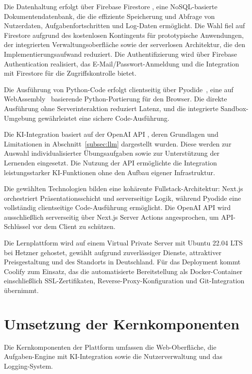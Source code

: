 Die Datenhaltung erfolgt über Firebase Firestore \cite{firebase}, eine NoSQL-basierte Dokumentendatenbank, die die effiziente Speicherung und Abfrage von Nutzerdaten, Aufgabenfortschritten und Log-Daten ermöglicht.
Die Wahl fiel auf Firestore aufgrund des kostenlosen Kontingents für prototypische Anwendungen, der integrierten Verwaltungsoberfläche sowie der serverlosen Architektur, die den Implementierungsaufwand reduziert.
Die Authentifizierung wird über Firebase Authentication \cite{firebase} realisiert, das E-Mail/Passwort-Anmeldung und die Integration mit Firestore für die Zugriffskontrolle bietet.

Die Ausführung von Python-Code erfolgt clientseitig über Pyodide~\cite{pyodide}, eine auf WebAssembly~\cite{webassembly} basierende Python-Portierung für den Browser. Die direkte Ausführung ohne Serverinteraktion reduziert Latenz, und die integrierte Sandbox-Umgebung gewährleistet eine sichere Code-Ausführung.

Die KI-Integration basiert auf der OpenAI API \cite{openai_api}, deren Grundlagen und Limitationen in Abschnitt~\ref{subsec:llm} dargestellt wurden.
Diese werden zur Auswahl individualisierter Übungsaufgaben sowie zur Unterstützung der Lernenden eingesetzt.
Die Nutzung der API ermöglichte die Integration leistungsstarker KI-Funktionen ohne den Aufbau eigener Infrastruktur.

Die gewählten Technologien bilden eine kohärente Fullstack-Architektur: Next.js orchestriert Präsentationsschicht und serverseitige Logik, während Pyodide eine vollständig clientseitige Code-Ausführung ermöglicht. Die OpenAI API wird ausschließlich serverseitig über Next.js Server Actions angesprochen, um API-Schlüssel vor dem Client zu schützen.

Die Lernplattform wird auf einem Virtual Private Server mit Ubuntu 22.04 LTS \cite{ubuntu} bei Hetzner \cite{hetzner} gehostet, gewählt aufgrund zuverlässiger Dienste, attraktiver Preisgestaltung und des Standorts in Deutschland.
Für das Deployment kommt Coolify \cite{coolify} zum Einsatz, das die automatisierte Bereitstellung als Docker-Container \cite{docker} einschließlich SSL-Zertifikaten, Reverse-Proxy-Konfigura\-tion und Git-Integration übernimmt.


\section{Umsetzung der Kernkomponenten}\label{sec:kernkomponenten}

Die Kernkomponenten der Plattform umfassen die Web-Oberfläche, die Aufgaben-Engine mit KI-Integration sowie die Nutzerverwaltung und das Logging-System.

